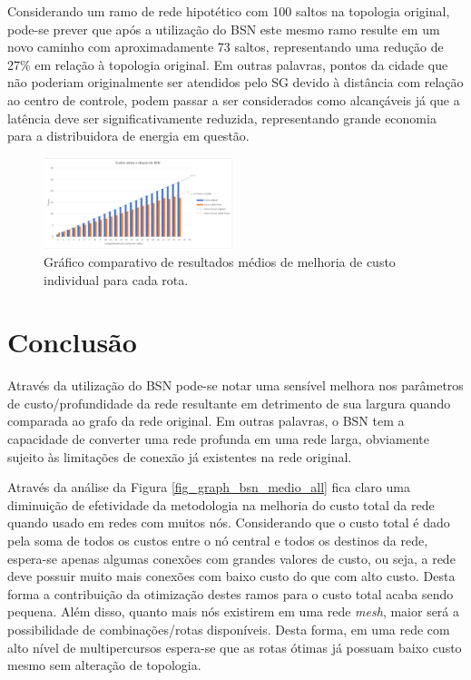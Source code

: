 \documentclass[conference]{IEEEtran}
\begin{document}
Considerando um ramo de rede hipotético com 100 saltos na topologia original, pode-se prever que após a utilização do BSN este mesmo ramo resulte em um novo caminho com aproximadamente 73 saltos, representando uma redução de 27\% em relação à topologia original. Em outras palavras, pontos da cidade que não poderiam originalmente ser atendidos pelo SG devido à distância com relação ao centro de controle, podem passar a ser considerados como alcançáveis já que a latência deve ser significativamente reduzida, representando grande economia para a distribuidora de energia em questão.

\begin{figure} [ht]%
	\centering
	\includegraphics[width=0.49\textwidth]{./figuras/Melhoria-por-custo.png} %
	\caption[Custo antes e depois do BSN]{Gráfico comparativo de resultados médios de melhoria de custo individual para cada rota.}
	\label{fig_graph_melhoria_por_custo}
\end{figure}


\section{Conclusão}
Através da utilização do BSN pode-se notar uma sensível melhora nos parâmetros de custo/profundidade da rede resultante em detrimento de sua largura quando comparada ao grafo da rede original. Em outras palavras, o BSN tem a capacidade de converter uma rede profunda em uma rede larga, obviamente sujeito às limitações de conexão já existentes na rede original.

Através da análise da Figura \ref{fig_graph_bsn_medio_all} fica claro uma diminuição de efetividade da metodologia na melhoria do custo total da rede quando usado em redes com muitos nós. Considerando que o custo total é dado pela soma de todos os custos entre o nó central e todos os destinos da rede, espera-se apenas algumas conexões com grandes valores de custo, ou seja, a rede deve possuir muito mais conexões com baixo custo do que com alto custo. Desta forma a contribuição da otimização destes ramos para o custo total acaba sendo pequena. Além disso, quanto mais nós existirem em uma rede \emph{mesh}, maior será a possibilidade de combinações/rotas disponíveis. Desta forma, em uma rede com alto nível de multipercursos espera-se que as rotas ótimas já possuam baixo custo mesmo sem alteração de topologia.
\end{document}
